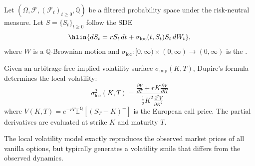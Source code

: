 \begin{definition} \label{definition:dupires_local_volatility_model_for_option_pricing}
Let $(\Omega, \mathcal{F}, (\mathcal{F}_t)_{t \geq 0}, \mathbb{Q})$ be a filtered probability space under the risk-neutral measure. Let $S = \{S_t\}_{t \geq 0}$ follow the SDE
$$\hlin{dS_t = r S_t \, dt + \sigma_{\text{loc}}(t, S_t) S_t \, dW_t},$$
where $W$ is a $\mathbb{Q}$-Brownian motion and $\sigma_{\text{loc}}: [0, \infty) \times (0, \infty) \to (0, \infty)$ is the .

Given an arbitrage-free implied volatility surface $\sigma_{\text{imp}}(K, T)$, Dupire's formula determines the local volatility:
$$\sigma_{\text{loc}}^2(K, T) = \frac{\frac{\partial V}{\partial T} + rK \frac{\partial V}{\partial K}}{\frac{1}{2} K^2 \frac{\partial^2 V}{\partial K^2}}$$
where $V(K, T) = e^{-rT} \mathbb{E}^{\mathbb{Q}}[(S_T - K)^+]$ is the European call price. The partial derivatives are evaluated at strike $K$ and maturity $T$.

The local volatility model exactly reproduces the observed market prices of all vanilla options, but typically generates a volatility smile that differs from the observed dynamics.
\end{definition}
